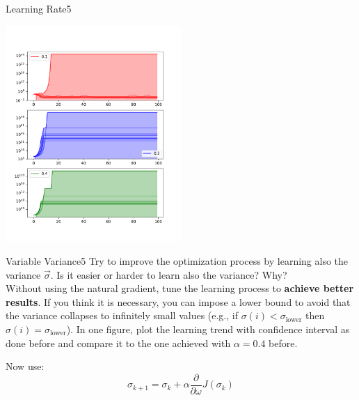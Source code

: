 \begin{questions}
\begin{question}{Learning Rate}{5}
\begin{answer}
	\begin{center}
		\includegraphics[width=0.5\textwidth]{img/PG-d.pdf}
	\end{center}
\end{answer}
\end{question}

	
\begin{question}{Variable Variance}{5}
	Try to improve the optimization process by learning also the variance $\vec \sigma$. Is it easier or harder to learn also the variance? Why?
	\\Without using the natural gradient, tune the learning process to \textbf{achieve better results}. If you think it is necessary, you can impose a lower bound to avoid that the variance collapses to infinitely small values (e.g., if $\sigma(i)<\sigma_{\text{lower}}$ then $\sigma(i) = \sigma_{\text{lower}}$).
	In one figure, plot the learning trend with confidence interval as done before and compare it to the one achieved with $\alpha = 0.4$ before.
	
\begin{answer}
	Now use:
\begin{equation}
\sigma_{k+1}=\sigma_k + \alpha \frac{\partial}{\partial \omega} J({\sigma_k})
\end{equation}
\end{answer}

\end{question}



\end{questions}
